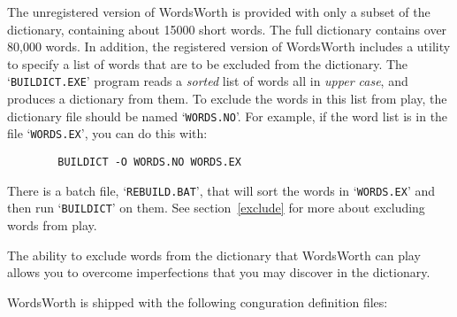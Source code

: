 The unregistered version of WordsWorth is provided with only 
a subset of the dictionary, containing about 15000 short words.
The full dictionary contains over 80,000 words. In addition, 
the registered version of WordsWorth includes a utility to
specify a list of words that are to be excluded from the
dictionary. The `{\tt BUILDICT.EXE}' program reads a {\em sorted} list
of words all in {\em upper case}, and produces a dictionary from 
them. To exclude the words in this list from play, the dictionary
file should be named `{\tt WORDS.NO}'. For example, if the word list
is in the file `{\tt WORDS.EX}', you can do this with:

\begin{verbatim}
        BUILDICT -O WORDS.NO WORDS.EX
\end{verbatim}

There is a batch file, `{\tt REBUILD.BAT}', that will sort the words
in `{\tt WORDS.EX}' and then run `{\tt BUILDICT}' on them.
See section~\ref{exclude} for more about excluding words from play.

The ability to exclude words from the dictionary that WordsWorth
can play allows you to overcome imperfections that you may 
discover in the dictionary.

WordsWorth is shipped with the following conguration definition 
files:

